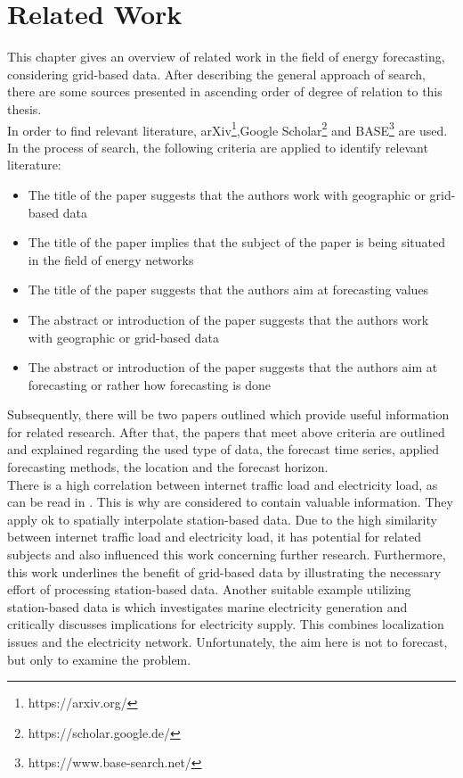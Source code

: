 \chapter{Related Work}
\label{ch:RW}

This chapter gives an overview of related work in the field of energy forecasting, considering grid-based data. After describing the general approach of search, there are some sources presented in ascending order of degree of relation to this thesis.\\

In order to find relevant literature, arXiv\footnote{https://arxiv.org/},Google Scholar\footnote{https://scholar.google.de/} and BASE\footnote{https://www.base-search.net/} are used.\\
In the process of search, the following criteria are applied to identify relevant literature:
\begin{itemize}
  \item The title of the paper suggests that the authors work with geographic or grid-based data
  \item The title of the paper implies that the subject of the paper is being situated in the field of energy networks
  \item The title of the paper suggests that the authors aim at forecasting values
  \item The abstract or introduction of the paper suggests that the authors work with geographic or grid-based data
  \item The abstract or introduction of the paper suggests that the authors aim at forecasting or rather how forecasting is done
\end{itemize}

Subsequently, there will be two papers outlined which provide useful information for related research. After that, the papers that meet above criteria are outlined and explained regarding the used type of data, the forecast time series, applied forecasting methods, the location and the forecast horizon.\\

There is a high correlation between internet traffic load and electricity load, as can be read in . This is why  are considered to contain valuable information. They apply \gls{ok} to spatially interpolate station-based data. Due to the high similarity between internet traffic load and electricity load, it has potential for related subjects and also influenced this work \eg concerning further research. Furthermore, this work underlines the benefit of grid-based data by illustrating the necessary effort of processing station-based data. Another suitable example utilizing station-based data is  which investigates marine electricity generation and critically discusses implications for electricity supply. This combines localization issues and the electricity network. Unfortunately, the aim here is not to forecast, but only to examine the problem.\\

